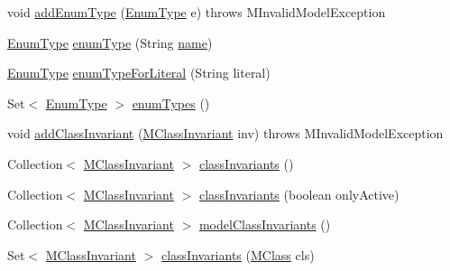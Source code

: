 \begin{DoxyCompactItemize}
void \hyperlink{classorg_1_1tzi_1_1use_1_1uml_1_1mm_1_1_m_model_a3ceb3b1fc365bebdd7362d1ee53a2eb8}{add\-Enum\-Type} (\hyperlink{classorg_1_1tzi_1_1use_1_1uml_1_1ocl_1_1type_1_1_enum_type}{Enum\-Type} e)  throws M\-Invalid\-Model\-Exception 
\item 
\hyperlink{classorg_1_1tzi_1_1use_1_1uml_1_1ocl_1_1type_1_1_enum_type}{Enum\-Type} \hyperlink{classorg_1_1tzi_1_1use_1_1uml_1_1mm_1_1_m_model_a5c5e4f3dc19ca0f2986d337a2973b050}{enum\-Type} (String \hyperlink{classorg_1_1tzi_1_1use_1_1uml_1_1mm_1_1_m_model_element_impl_ac9997b04c10d247c21c22d431d99400d}{name})
\item 
\hyperlink{classorg_1_1tzi_1_1use_1_1uml_1_1ocl_1_1type_1_1_enum_type}{Enum\-Type} \hyperlink{classorg_1_1tzi_1_1use_1_1uml_1_1mm_1_1_m_model_afbac9330ccabb03dbd51dda72c73a7da}{enum\-Type\-For\-Literal} (String literal)
\item 
Set$<$ \hyperlink{classorg_1_1tzi_1_1use_1_1uml_1_1ocl_1_1type_1_1_enum_type}{Enum\-Type} $>$ \hyperlink{classorg_1_1tzi_1_1use_1_1uml_1_1mm_1_1_m_model_abb43c0229673d667347545d3566518f1}{enum\-Types} ()
\item 
void \hyperlink{classorg_1_1tzi_1_1use_1_1uml_1_1mm_1_1_m_model_a1e106d5a777665001b247d97a4122a34}{add\-Class\-Invariant} (\hyperlink{classorg_1_1tzi_1_1use_1_1uml_1_1mm_1_1_m_class_invariant}{M\-Class\-Invariant} inv)  throws M\-Invalid\-Model\-Exception 
\item 
Collection$<$ \hyperlink{classorg_1_1tzi_1_1use_1_1uml_1_1mm_1_1_m_class_invariant}{M\-Class\-Invariant} $>$ \hyperlink{classorg_1_1tzi_1_1use_1_1uml_1_1mm_1_1_m_model_a3a3e2a2fbbb902e09c24745eaf834b1c}{class\-Invariants} ()
\item 
Collection$<$ \hyperlink{classorg_1_1tzi_1_1use_1_1uml_1_1mm_1_1_m_class_invariant}{M\-Class\-Invariant} $>$ \hyperlink{classorg_1_1tzi_1_1use_1_1uml_1_1mm_1_1_m_model_ac9f4f17655accdec7238ea107db41c7d}{class\-Invariants} (boolean only\-Active)
\item 
Collection$<$ \hyperlink{classorg_1_1tzi_1_1use_1_1uml_1_1mm_1_1_m_class_invariant}{M\-Class\-Invariant} $>$ \hyperlink{classorg_1_1tzi_1_1use_1_1uml_1_1mm_1_1_m_model_a36697afcc209f0afeb5c0ded05da78b6}{model\-Class\-Invariants} ()
\item 
Set$<$ \hyperlink{classorg_1_1tzi_1_1use_1_1uml_1_1mm_1_1_m_class_invariant}{M\-Class\-Invariant} $>$ \hyperlink{classorg_1_1tzi_1_1use_1_1uml_1_1mm_1_1_m_model_a7bfd77b929b078c6b5d4acbdb7158277}{class\-Invariants} (\hyperlink{interfaceorg_1_1tzi_1_1use_1_1uml_1_1mm_1_1_m_class}{M\-Class} cls)

\end{DoxyCompactItemize}
